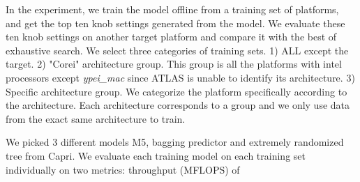 In the experiment, we train the model offline from a training set of platforms, and get the top ten knob settings generated from the model.
We evaluate these ten knob settings on another target platform and compare it with the best of exhaustive search. We select
three categories of training sets. 1) ALL except the target. 2) "Corei" architecture group. This group is all the platforms
with intel processors except \textit{ypei\_mac} since ATLAS is unable to identify its architecture. 3) Specific architecture group.
We categorize the platform specifically according to the architecture. Each architecture corresponds to a group and we only use data
from the exact same architecture to train. \par

We picked 3 different models M5, bagging predictor and extremely randomized tree from Capri. We evaluate each training model on each training
set individually on two metrics: throughput (MFLOPS) of
